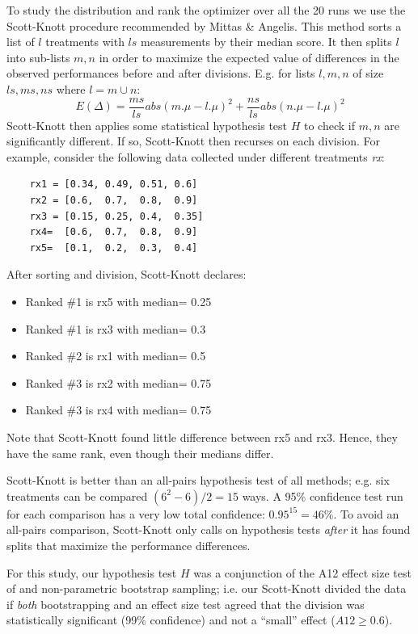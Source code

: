 \documentclass[conference]{IEEEtran}
\newcommand{\bi}{\begin{itemize}}
\newcommand{\ei}{\end{itemize}}
\begin{document}
To study the distribution and rank the optimizer over all the 20 runs we use the Scott-Knott procedure recommended by Mittas \& Angelis\cite{mittas13}. This method
sorts a list of $l$ treatments with $ls$ measurements by their median
score. It then
splits $l$ into sub-lists $m,n$ in order to maximize the expected value of
differences  in the observed performances
before and after divisions. E.g. for lists $l,m,n$ of size $ls,ms,ns$ where $l=m\cup n$:
\[E(\Delta)=\frac{ms}{ls}abs(m.\mu - l.\mu)^2 + \frac{ns}{ls}abs(n.\mu - l.\mu)^2\]
Scott-Knott then applies some statistical hypothesis test $H$ to check
if $m,n$ are significantly different. If so, Scott-Knott then recurses on each division.
For example, consider the following data collected under different treatments {\em rx}:

{\scriptsize \begin{verbatim}
	rx1 = [0.34, 0.49, 0.51, 0.6]
	rx2 = [0.6,  0.7,  0.8,  0.9]
	rx3 = [0.15, 0.25, 0.4,  0.35]
	rx4=  [0.6,  0.7,  0.8,  0.9]
	rx5=  [0.1,  0.2,  0.3,  0.4]
	\end{verbatim}}
\noindent
After sorting and division, Scott-Knott declares:
\bi
\item Ranked \#1 is rx5 with median= 0.25
\item Ranked \#1 is rx3 with median= 0.3
\item Ranked \#2 is rx1 with median= 0.5
\item Ranked \#3 is rx2 with median= 0.75
\item Ranked \#3 is rx4 with median= 0.75
\ei
Note that Scott-Knott found  little
difference between rx5 and rx3. Hence,
they have the same rank, even though their medians differ.

Scott-Knott is better than an 
all-pairs hypothesis test of all methods; e.g. six treatments
can be compared \mbox{$(6^2-6)/2=15$} ways. 
A 95\% confidence test run for each comparison has  a very low total confidence: 
\mbox{$0.95^{15} = 46$}\%.
To avoid an all-pairs comparison, Scott-Knott only calls on hypothesis
tests {\em after} it has found splits that maximize the performance differences.

For this study, our hypothesis test $H$ was a
conjunction of the A12 effect size test of  and
non-parametric bootstrap sampling; i.e. our
Scott-Knott divided the data if {\em both}
bootstrapping and an effect size test agreed that
the division was statistically significant (99\%
confidence) and not a ``small'' effect ($A12 \ge
0.6$).
\end{document}
